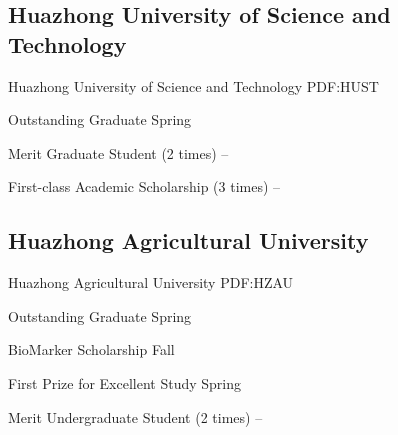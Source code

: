 \documentclass[letterpaper,10pt,oneside]{article}
\begin{document}
\begin{body}
\subsection
{Huazhong University of Science and Technology}
{Huazhong University of Science and Technology}
{PDF:HUST}
\GapNoBreak

\BulletItem
Outstanding Graduate
\hfill
Spring 

\GapNoBreak

\BulletItem
Merit Graduate Student (2 times)
\hfill
{} --

\GapNoBreak
\BulletItem
First-class Academic Scholarship (3 times)
\hfill
{} --
\BigGap
\GapNoBreak
\subsection
{Huazhong Agricultural University}
{Huazhong Agricultural University}
{PDF:HZAU}

\BulletItem
Outstanding Graduate
\hfill
Spring 

\GapNoBreak
\BulletItem
BioMarker Scholarship 
\hfill
Fall 

\GapNoBreak
\BulletItem
First Prize for Excellent Study 
\hfill
Spring 

\GapNoBreak
\BulletItem
Merit Undergraduate Student (2 times)
\hfill
{} --
\fi




\iffalse
\section
{Languages}
{Languages}
{PDF:Languages}

\BulletItem
English: Native language.

\GapNoBreak
\BulletItem
Spanish: Fluent (speaking, reading, writing).

\GapNoBreak
\BulletItem
Latin: Intermediate (reading); basic (speaking, writing).
\fi



\end{body}
\end{document}
